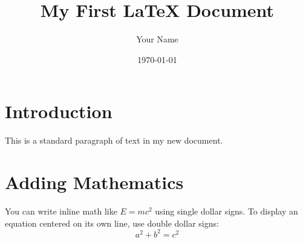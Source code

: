 \documentclass[12pt, letterpaper]{article} %
\title{My First LaTeX Document}
\author{Your Name}
\date{\today}                              %
\begin{document}
\maketitle                                 %

\section{Introduction}
This is a standard paragraph of text in my new document. 

\section{Adding Mathematics}
You can write inline math like $E = mc^2$ using single dollar signs. 
To display an equation centered on its own line, use double dollar signs:
$$a^2 + b^2 = c^2$$
\end{document}
